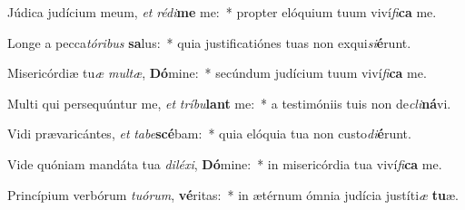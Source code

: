 \item Júdica judícium meum, \textit{et} \textit{réd}\textit{i}\textbf{me} me:~* propter elóquium tuum viví\textit{fi}\textbf{ca} me.
\item Longe a pecca\textit{tó}\textit{ri}\textit{bus} \textbf{sa}lus:~* quia justificatiónes tuas non exqui\textit{si}\textbf{é}runt.
\item Misericórdiæ tu\textit{æ} \textit{mul}\textit{tæ}, \textbf{Dó}mine:~* secúndum judícium tuum viví\textit{fi}\textbf{ca} me.
\item Multi qui persequúntur me, \textit{et} \textit{trí}\textit{bu}\textbf{lant} me:~* a testimóniis tuis non de\textit{cli}\textbf{ná}vi.
\item Vidi prævaricántes, \textit{et} \textit{ta}\textit{be}\textbf{scé}bam:~* quia elóquia tua non custo\textit{di}\textbf{é}runt.
\item Vide quóniam mandáta tua \textit{di}\textit{lé}\textit{xi}, \textbf{Dó}mine:~* in misericórdia tua viví\textit{fi}\textbf{ca} me.
\item Princípium verbórum \textit{tu}\textit{ó}\textit{rum}, \textbf{vé}ritas:~* in ætérnum ómnia judícia justíti\textit{æ} \textbf{tu}æ.
